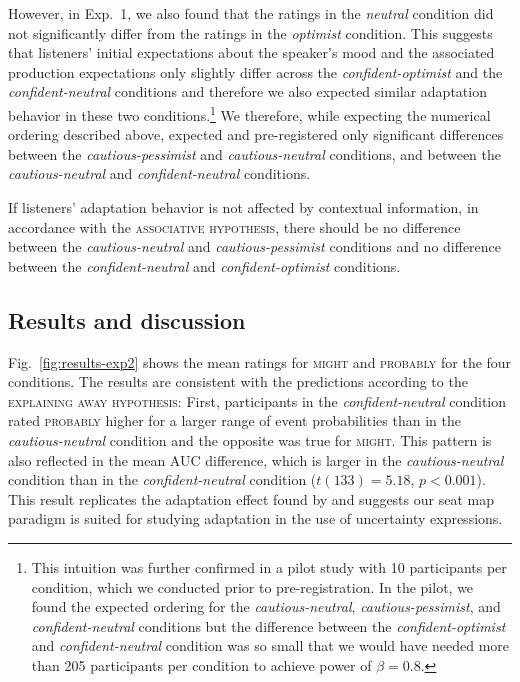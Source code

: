 \documentclass[man,floatsintext]{apa6}
\begin{document}
However, in Exp.~1, we also found that the ratings in the \textit{neutral} condition did not significantly differ from the ratings in the \textit{optimist} condition. This suggests that listeners' initial expectations about the speaker's mood and the associated production expectations only slightly differ across the \textit{confident-optimist} and the \textit{confident-neutral} conditions and therefore we also expected similar adaptation behavior in these two conditions.\footnote{This intuition was further confirmed in a pilot study with 10 participants per condition, which we conducted prior to pre-registration. In the pilot, we found the expected ordering for the \textit{cautious-neutral}, \textit{cautious-pessimist}, and \textit{confident-neutral} conditions but the difference between the \textit{confident-optimist} and \textit{confident-neutral} condition was so small that we would have needed more than 205 participants per condition to achieve power of $\beta=0.8$.} We therefore, while expecting the numerical ordering described above, expected and pre-registered only significant differences between the \textit{cautious-pessimist} and \textit{cautious-neutral} conditions, and between the \textit{cautious-neutral} and \textit{confident-neutral} conditions.

If listeners' adaptation behavior is not affected by contextual information, in accordance with the \textsc{associative hypothesis}, there should be no difference between the \textit{cautious-neutral} and  \textit{cautious-pessimist} conditions and no difference between the \textit{confident-neutral} and \textit{confident-optimist} conditions.

\subsection{Results and discussion}

Fig.~\ref{fig:results-exp2} shows the mean ratings for \textsc{might} and \textsc{probably} for the four conditions. The results are consistent with the predictions according to the \textsc{explaining away hypothesis}: First, participants in the \textit{confident-neutral} condition rated \textsc{probably} higher for a larger range of event probabilities than in the \textit{cautious-neutral} condition and the opposite was true for \textsc{might}. This pattern is also reflected in the mean AUC difference, which is larger in the \textit{cautious-neutral} condition than in the \textit{confident-neutral} condition ($t(133)=5.18$, $p < 0.001$). This result replicates the adaptation effect found by  and suggests our seat map paradigm is suited for studying adaptation in the use of uncertainty expressions.
\end{document}
